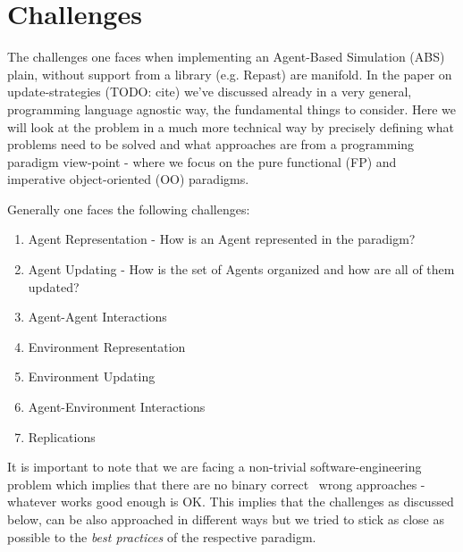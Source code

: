 \section{Challenges}
The challenges one faces when implementing an Agent-Based Simulation (ABS) plain, without support from a library (e.g. Repast) are manifold. In the paper on update-strategies (TODO: cite) we've discussed already in a very general, programming language agnostic way, the fundamental things to consider. Here we will look at the problem in a much more technical way by precisely defining what problems need to be solved and what approaches are from a programming paradigm view-point - where we focus on the pure functional (FP) and imperative object-oriented (OO) paradigms.

Generally one faces the following challenges:

\begin{enumerate}
	\item Agent Representation - How is an Agent represented in the paradigm?
	\item Agent Updating - How is the set of Agents organized and how are all of them updated?
	\item Agent-Agent Interactions 
	\item Environment Representation
	\item Environment Updating
	\item Agent-Environment Interactions
	\item Replications
\end{enumerate}

It is important to note that we are facing a non-trivial software-engineering problem which implies that there are no binary correct \ wrong approaches - whatever works good enough is OK. This implies that the challenges as discussed below, can be also approached in different ways but we tried to stick as close as possible to the \textit{best practices} of the respective paradigm.

